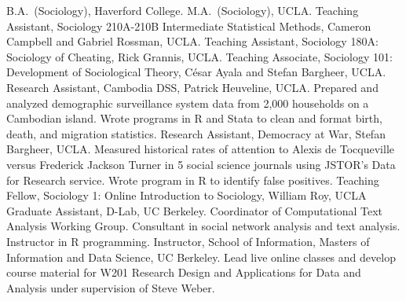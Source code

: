 %
%
                {B.A.~(Sociology), Haverford College.}
                {M.A.~(Sociology), UCLA.}
                {Teaching Assistant, Sociology 210A-210B Intermediate Statistical Methods, Cameron Campbell and Gabriel Rossman, UCLA.}
                {Teaching Assistant, Sociology 180A: Sociology of Cheating, Rick Grannis, UCLA.}
                {Teaching Associate, Sociology 101: Development of Sociological Theory, César Ayala and Stefan Bargheer, UCLA.}
                {Research Assistant, Cambodia DSS, Patrick Heuveline, UCLA. Prepared and analyzed demographic surveillance system data from 2,000 households on a Cambodian island. Wrote programs in R and Stata to clean and format birth, death, and migration statistics.}
                {Research Assistant, Democracy at War, Stefan Bargheer, UCLA. Measured historical rates of attention to Alexis de Tocqueville versus Frederick Jackson Turner in 5 social science journals using JSTOR’s Data for Research service. Wrote program in R to identify false positives.}
                {Teaching Fellow, Sociology 1: Online Introduction to Sociology, William Roy, UCLA}
                {Graduate Assistant, D-Lab, UC Berkeley. Coordinator of Computational Text Analysis Working Group. Consultant in social network analysis and text analysis. Instructor in R programming.}
                {Instructor, School of Information, Masters of Information and Data Science, UC Berkeley. Lead live online classes and develop course material for W201 Research Design and Applications for Data and Analysis under supervision of Steve Weber.}





